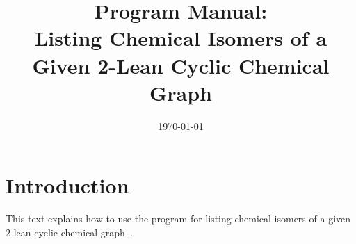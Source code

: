 \documentclass[11pt,titlepage,dvipdfmx,twoside]{article}
\title{\Huge{
Program Manual: \\
Listing Chemical Isomers of a Given 2-Lean Cyclic Chemical Graph}}
\begin{document}

\date{\today}

\maketitle


\thispagestyle{empty}
\tableofcontents
\clearpage



\section{Introduction}
\label{sec:intro}

This text explains how to use the program for listing
chemical isomers of a given 2-lean cyclic chemical graph~\cite{branch}.
\end{document}
